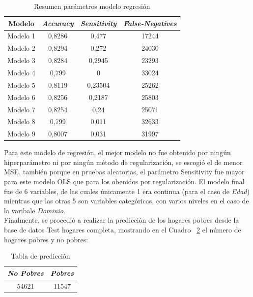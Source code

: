 \documentclass[conference, 10pt]{IEEEtran}
\begin{document}
\begin{table}[htbp]
\caption{Resumen parámetros modelo regresión}
\begin{center}
\begin{tabular}{|c|c|c|c|}
\hline
\textbf{Modelo} & \textbf{\textit{Accuracy}}& \textbf{\textit{Sensitivity}} & \textbf{\textit{False-Negatives}}\\
\hline
Modelo 1& 0,8286&0,477&17244\\
\hline
Modelo 2& 0,8294&0,272&24030\\
\hline
Modelo 3& 0,8284&0,2945&23293\\
\hline
Modelo 4& 0,799&0&33024\\
\hline
Modelo 5& 0,8119&0,23504&25262\\
\hline
Modelo 6& 0,8256&0,2187&25803\\
\hline
Modelo 7& 0,8254&0,24&25071\\
\hline
Modelo 8& 0,799&0,011&32633\\
\hline
Modelo 9& 0,8007&0,031&31997\\
\hline
\end{tabular}
\label{tab_2}
\end{center}
\end{table}


Para este modelo de regresión, el mejor modelo no fue obtenido por ningún hiperparámetro ni por ningún método de regularización, se escogió el de menor MSE, también porque en pruebas aleatorias, el parámetro Sensitivity fue mayor para este modelo OLS que para los obenidos por regularización. El modelo final fue de 6 variables, de las cuales únicamente 1 era continua (para el caso de \textit{Edad}) mientras que las otras 5 son variables categóricas, con varios niveles en el caso de la varibale \textit{Dominio}. \\
Finalmente, se procedió a realizar la predicción de los hogares pobres desde la base de datos Test hogares completa, mostrando en el Cuadro ~\ref{tab_21} el número de hogares pobres y no pobres:

\begin{table}[htbp]
\caption{Tabla de predicción}
\begin{center}
\begin{tabular}{|c|c|}
\hline
\textbf{\textit{No Pobres}}& \textbf{\textit{Pobres}}\\
\hline
54621&11547\\
\hline

\end{tabular}
\label{tab_21}
\end{center}
\end{table}
\end{document}

